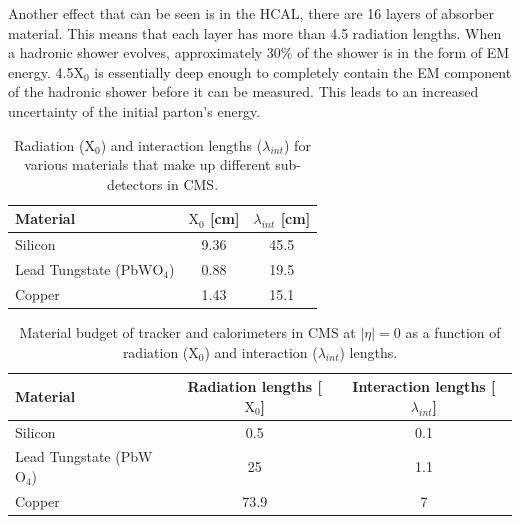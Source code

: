 Another effect that can be seen is in the HCAL, there are 16 layers of absorber material.
This means that each layer has more than 4.5 radiation lengths.
When a hadronic shower evolves, approximately 30\% of the shower is in the form of EM energy.
4.5$\mathrm{X_{0}}$ is essentially deep enough to completely contain the EM component of the hadronic shower before it can be measured.
This leads to an increased uncertainty of the initial parton's energy.

\begin{table}[htb]                                                                                                                                                              
  \begin{center}
    \caption{
      \label{tab:rad_int_lengths}
      Radiation ($\mathrm{X_{0}}$) and interaction lengths ($\lambda_{int}$) for various materials that make up different sub-detectors in CMS.
    }
    \begin{tabular}{l|c|c}
      \hline
      \hline
      Material & $\mathrm{X_{0}}$ [cm] & $\lambda_{int}$ [cm] \\
      \hline
      Silicon                             & 9.36 & 45.5 \\
      Lead Tungstate (PbW$\mathrm{O_{4}}$) & 0.88 & 19.5 \\
      Copper                              & 1.43 & 15.1 \\
      \hline
      \hline
    \end{tabular}
  \end{center}
\end{table}

\begin{table}[htb]                                                                                                                                                              
  \begin{center}
    \caption{
      \label{tab:materialbudget}
      Material budget of tracker and calorimeters in CMS at $|\eta|=0$ as a function of radiation ($\mathrm{X_{0}}$) and interaction ($\lambda_{int}$) lengths.
    }
    \begin{tabular}{l|c|c}
      \hline
      \hline
      Material & Radiation lengths [$\mathrm{X_{0}}$] & Interaction lengths [$\lambda_{int}$]  \\
      \hline
      Silicon                             & 0.5 & 0.1 \\
      Lead Tungstate (PbW$\mathrm{O_{4}}$) & 25 & 1.1 \\
      Copper                              & 73.9 & 7 \\
      \hline
      \hline
    \end{tabular}
  \end{center}
\end{table}


